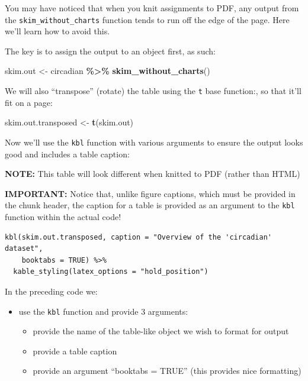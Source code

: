 \documentclass[
]{book}
\newenvironment{Shaded}{\begin{snugshade}}{\end{snugshade}}
\newcommand{\FunctionTok}[1]{\textcolor[rgb]{0.13,0.29,0.53}{\textbf{#1}}}
\newcommand{\NormalTok}[1]{#1}
\newcommand{\OtherTok}[1]{\textcolor[rgb]{0.56,0.35,0.01}{#1}}
\newcommand{\SpecialCharTok}[1]{\textcolor[rgb]{0.81,0.36,0.00}{\textbf{#1}}}
\providecommand{\tightlist}{%
  \setlength{\itemsep}{0pt}\setlength{\parskip}{0pt}}
\begin{document}
You may have noticed that when you knit assignments to PDF, any output from the \texttt{skim\_without\_charts} function tends to run off the edge of the page. Here we'll learn how to avoid this.

The key is to assign the output to an object first, as such:

\begin{Shaded}
\begin{Highlighting}[]
\NormalTok{skim.out }\OtherTok{\textless{}{-}}\NormalTok{ circadian }\SpecialCharTok{\%\textgreater{}\%}
  \FunctionTok{skim\_without\_charts}\NormalTok{()}
\end{Highlighting}
\end{Shaded}

We will also ``transpose'' (rotate) the table using the \texttt{t} base function:, so that it'll fit on a page:

\begin{Shaded}
\begin{Highlighting}[]
\NormalTok{skim.out.transposed }\OtherTok{\textless{}{-}} \FunctionTok{t}\NormalTok{(skim.out)}
\end{Highlighting}
\end{Shaded}

Now we'll use the \texttt{kbl} function with various arguments to ensure the output looks good and includes a table caption:

\textbf{NOTE: }
This table will look different when knitted to PDF (rather than HTML)

\textbf{IMPORTANT: }
Notice that, unlike figure captions, which must be provided in the chunk header, the caption for a table is provided as an argument to the \texttt{kbl} function within the actual code!

\begin{verbatim}
kbl(skim.out.transposed, caption = "Overview of the 'circadian' dataset",
    booktabs = TRUE) %>%
  kable_styling(latex_options = "hold_position")
\end{verbatim}

In the preceding code we:

\begin{itemize}
\tightlist
\item
  use the \texttt{kbl} function and provide 3 arguments:

  \begin{itemize}
  \tightlist
  \item
    provide the name of the table-like object we wish to format for output
  \item
    provide a table caption
  \item
    provide an argument ``booktabs = TRUE'' (this provides nice formatting)
  \end{itemize}
\end{itemize}
\end{document}
